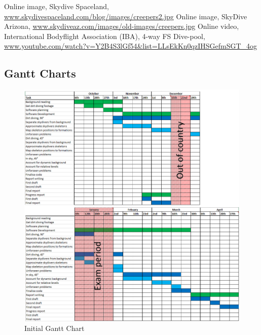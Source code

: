 \documentclass[a4paper, 11pt]{article}
\begin{document}
\begin{thebibliography}{9}
    Online image,
    Skydive Spaceland,
    \url{www.skydivespaceland.com/blog/images/creepers2.jpg}
%
    Online image,
    SkyDive Arizona,
    \url{www.skydiveaz.com/images/old-images/creepers.jpg}
%
    Online video,
    International Bodyflight Association (IBA),
    4-way FS Dive-pool,
    \url{www.youtube.com/watch?v=Y2B4S3lGf54&list=LLsEkKn0qzIHSGefmSGT_4og}

\end{thebibliography}

\begin{appendices}

\chapter{Gantt Charts}
\begin{figure}[H]
	\centering
	\includegraphics[width=\linewidth]{Gantt_initial_split.png}
	\caption{Initial Gantt Chart}
	\label{fig:gantt_initial}
\end{figure}



\end{appendices}
\end{document}

